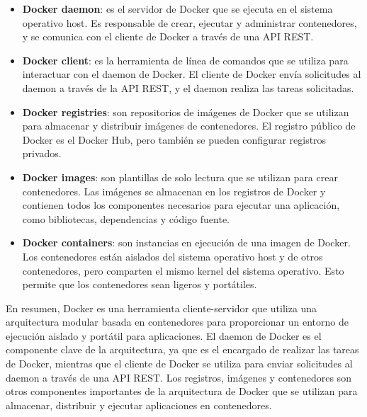 \documentclass{article}
\begin{document}
\begin{itemize}
\item \textbf{Docker daemon}: es el servidor de Docker que se ejecuta en el sistema operativo host. Es responsable de crear, ejecutar y administrar contenedores, y se comunica con el cliente de Docker a través de una API REST.
\item \textbf{Docker client}: es la herramienta de línea de comandos que se utiliza para interactuar con el daemon de Docker. El cliente de Docker envía solicitudes al daemon a través de la API REST, y el daemon realiza las tareas solicitadas.
\item \textbf{Docker registries}: son repositorios de imágenes de Docker que se utilizan para almacenar y distribuir imágenes de contenedores. El registro público de Docker es el Docker Hub, pero también se pueden configurar registros privados.
\item \textbf{Docker images}: son plantillas de solo lectura que se utilizan para crear contenedores. Las imágenes se almacenan en los registros de Docker y contienen todos los componentes necesarios para ejecutar una aplicación, como bibliotecas, dependencias y código fuente.
\item \textbf{Docker containers}: son instancias en ejecución de una imagen de Docker. Los contenedores están aislados del sistema operativo host y de otros contenedores, pero comparten el mismo kernel del sistema operativo. Esto permite que los contenedores sean ligeros y portátiles.
\end{itemize}

En resumen, Docker es una herramienta cliente-servidor que utiliza una arquitectura modular basada en contenedores para proporcionar un entorno de ejecución aislado y portátil para aplicaciones. El daemon de Docker es el componente clave de la arquitectura, ya que es el encargado de realizar las tareas de Docker, mientras que el cliente de Docker se utiliza para enviar solicitudes al daemon a través de una API REST. Los registros, imágenes y contenedores son otros componentes importantes de la arquitectura de Docker que se utilizan para almacenar, distribuir y ejecutar aplicaciones en contenedores.

\newpage
\end{document}
